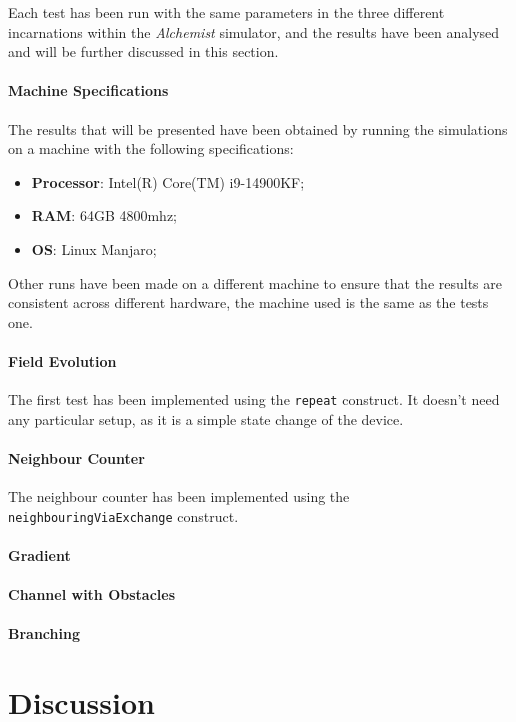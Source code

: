 Each test has been run with the same parameters in the three different incarnations within the \emph{Alchemist} simulator,
and the results have been analysed and will be further discussed in this section.

\paragraph{Machine Specifications}
The results that will be presented have been obtained by running the simulations on a machine with the following specifications:
\begin{itemize}
    \item \textbf{Processor}: Intel(R) Core(TM) i9-14900KF;
    \item \textbf{RAM}: 64GB 4800mhz;
    \item \textbf{OS}: Linux Manjaro;
\end{itemize}

Other runs have been made on a different machine to ensure that the results are consistent across different hardware,
the machine used is the same as the tests one.

\paragraph{Field Evolution}
The first test has been implemented using the \texttt{repeat} construct.
It doesn't need any particular setup, as it is a simple state change of the device.


\paragraph{Neighbour Counter}
The neighbour counter has been implemented using the \texttt{neighbouringViaExchange} construct.

\paragraph{Gradient}

\paragraph{Channel with Obstacles}

\paragraph{Branching}

\section{Discussion}

